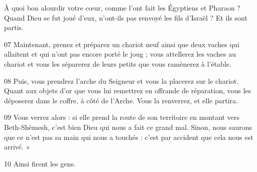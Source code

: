 À quoi bon alourdir votre cœur, comme l’ont fait les Égyptiens et Pharaon ? Quand Dieu se fut joué d’eux, n’ont-ils pas renvoyé les fils d’Israël ? Et ils sont partis.

07 Maintenant, prenez et préparez un chariot neuf ainsi que deux vaches qui allaitent et qui n’ont pas encore porté le joug ; vous attellerez les vaches au chariot et vous les séparerez de leurs petits que vous ramènerez à l’étable.

08 Puis, vous prendrez l’arche du Seigneur et vous la placerez sur le chariot. Quant aux objets d’or que vous lui remettrez en offrande de réparation, vous les déposerez dans le coffre, à côté de l’Arche. Vous la renverrez, et elle partira.

09 Vous verrez alors : si elle prend la route de son territoire en montant vers Beth-Shèmesh, c’est bien Dieu qui nous a fait ce grand mal. Sinon, nous saurons que ce n’est pas sa main qui nous a touchés : c’est par accident que cela nous est arrivé. »

10 Ainsi firent les gens.